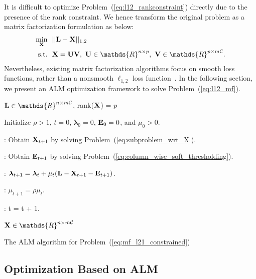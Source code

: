\documentclass[10pt,twocolumn,letterpaper]{article}
\def\bE{{\bf E}}
\def\blambda{{\bm \lambda}}
\def\calC{{\mathcal{C}}}
\def\bL{{\bf L}}
\def\bU{{\bf U}}
\def\bV{{\bf V}}
\def\dsR{\mathds{R}}
\def\bX{{\bf X}}
\def\bX{{\bf X}}
\def\st{{\text{s.t.}}}
\begin{document}
It is difficult to optimize Problem~(\ref{eq:l12_rankconstraint}) directly due to the presence of the rank constraint.
We hence transform the original problem as a matrix factorization formulation as below:
{\small
\begin{align}\label{eq:l12_mf}
  \min_{\bX} ~&~ || \bL - \bX ||_{1,2}   \nonumber \\
         \st ~&~ \bX = \bU \bV,~\bU \in \dsR^{n \times p},~\bV \in \dsR^{p \times m\calC}  .
\end{align}
}
\noindent
Nevertheless, existing matrix factorization algorithms focus on smooth loss functions, rather than a nonsmooth $\ell_{1,2}$ loss function~\cite{tanicml2014riemannian,vandereycken2013lowrank,Wen2012,ngonips2012scaled,rtrmc2011boumal}.
In the following section, we present an ALM optimization framework to solve Problem~(\ref{eq:l12_mf}).


\begin{algorithm}[ht]

\begin{algorithmic}

\REQUIRE $\bL \in \dsR^{n \times m\calC}$, rank($\bX$) = $p$

\STATE Initialize $\rho > 1$, $t = 0$, $\blambda_{0} = 0$, $\bE_{0} = 0$, and $\mu_{0} > 0$.

\WHILE{$t = 0$ or $L_1(\bE_{t+1}-\bE_{t}) \geq \epsilon$}


    : Obtain $\bX_{t+1}$ by solving Problem~(\ref{eq:subproblem_wrt_X}).

    : Obtain $\bE_{t+1}$ by solving Problem~(\ref{eq:column_wise_soft_thresholding}).

  \ENDWHILE

  : $\blambda_{t+1} = \blambda_{t} + \mu_{t} (\bL - \bX_{t+1} - \bE_{t+1})$.

  : $\mu_{t+1} = \rho \mu_{t}$.

  : t = t + 1.

\ENDWHILE

\ENSURE $\bX \in \dsR^{n \times m\calC}$

\end{algorithmic}
\caption{The ALM algorithm for Problem~(\ref{eq:mf_l21_constrained})}
\label{alg:alm_mf}
\end{algorithm}


\subsection{Optimization Based on ALM}
\end{document}
